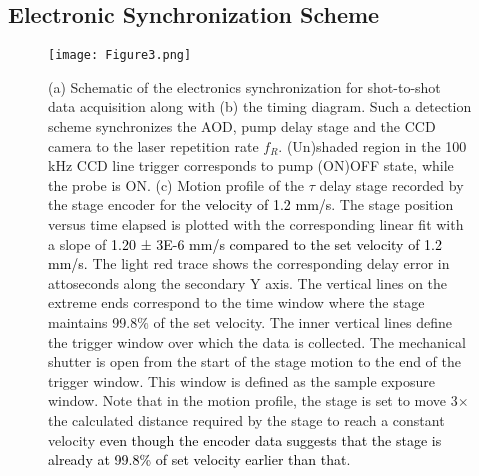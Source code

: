 \documentclass[%
aip,
amsmath,amssymb,
preprint,%
]{revtex4-2}
\newcommand*{\vt}[1]{\textcolor{black}{ #1}}
\newcommand*{\si}[1]{\textcolor{black}{ #1}}
\begin{document}
\subsection{Electronic Synchronization Scheme}\label{sync}

\begin{figure}[h!]
\centering\texttt{[image: Figure3.png]}
\caption{(a) Schematic of the electronics synchronization for shot-to-shot data acquisition along with (b) the timing diagram. Such a detection scheme synchronizes the AOD, pump delay stage and the CCD camera to the laser repetition rate $f_R$. (Un)shaded region in the 100 kHz CCD line trigger corresponds to pump (ON)OFF state, while the probe is ON. (c) Motion profile of the $\tau$ delay stage recorded by the stage encoder for the \si{velocity of 1.2 mm/s}. The stage position versus time elapsed is plotted with the corresponding linear fit with a slope of \si{1.20 ± 3E{-6} mm/s compared to the set velocity of 1.2 mm/s.} The light red trace shows the corresponding delay error in attoseconds along the secondary Y axis. The vertical lines on the extreme ends correspond to the time window where the stage maintains 99.8$\%$ of the set velocity. The inner vertical lines define the trigger window over which the data is collected. The mechanical shutter is open from the start of the stage motion to the end of the trigger window. This window is defined as the sample exposure window. Note that in the motion profile, the stage is set to move 3$\times$ the calculated distance required by the stage to reach a constant velocity \vt{even though the encoder data suggests that the stage is already at 99.8\% of set velocity earlier than that}.}
\label{fig:fig3}
\end{figure}
\end{document}
